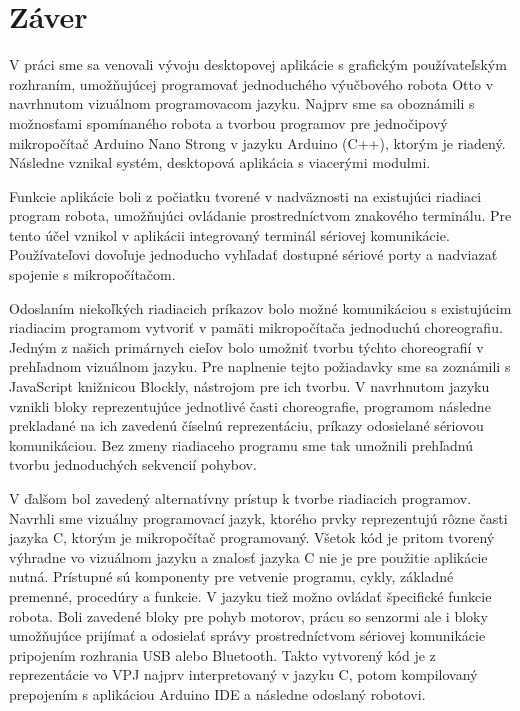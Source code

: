 \chapter*{Záver}  %

V práci sme sa venovali vývoju desktopovej aplikácie s grafickým používateľským rozhraním, umožňujúcej programovať jednoduchého výučbového robota Otto v navrhnutom vizuálnom programovacom jazyku. Najprv sme sa oboznámili s možnosťami spomínaného robota a tvorbou programov pre jednočipový mikropočítač Arduino Nano Strong v jazyku Arduino (C++), ktorým je riadený. Následne vznikal systém, desktopová aplikácia s viacerými modulmi.

Funkcie aplikácie boli z počiatku tvorené v nadväznosti na existujúci riadiaci program robota, umožňujúci ovládanie prostredníctvom znakového terminálu. Pre tento účel vznikol v aplikácii integrovaný terminál sériovej komunikácie. Používateľovi dovoľuje jednoducho vyhľadať dostupné sériové porty a nadviazať spojenie s mikropočítačom.

Odoslaním niekoľkých riadiacich príkazov bolo možné komunikáciou s existujúcim riadiacim programom vytvoriť v pamäti mikropočítača jednoduchú choreografiu. Jedným z našich primárnych cieľov bolo umožniť tvorbu týchto choreografií v prehľadnom vizuálnom jazyku. Pre naplnenie tejto požiadavky sme sa zoznámili s JavaScript knižnicou Blockly, nástrojom pre ich tvorbu. V navrhnutom jazyku vznikli bloky reprezentujúce jednotlivé časti choreografie, programom následne prekladané na ich zavedenú číselnú reprezentáciu, príkazy odosielané sériovou komunikáciou. Bez zmeny riadiaceho programu sme tak umožnili prehľadnú tvorbu jednoduchých sekvencií pohybov.

V ďalšom bol zavedený alternatívny prístup k tvorbe riadiacich programov. Navrhli sme vizuálny programovací jazyk, ktorého prvky reprezentujú rôzne časti jazyka C, ktorým je mikropočítač programovaný. Všetok kód je pritom tvorený výhradne vo vizuálnom jazyku a znalosť jazyka C nie je pre použitie aplikácie nutná. Prístupné sú komponenty pre vetvenie programu, cykly, základné premenné, procedúry a funkcie. V jazyku tiež možno ovládať špecifické funkcie robota. Boli zavedené bloky pre pohyb motorov, prácu so senzormi ale i bloky umožňujúce prijímať a odosielať správy prostredníctvom sériovej komunikácie pripojením rozhrania USB alebo Bluetooth. Takto vytvorený kód je z reprezentácie vo VPJ najprv interpretovaný v jazyku C, potom kompilovaný prepojením s aplikáciou Arduino IDE a následne odoslaný robotovi.

